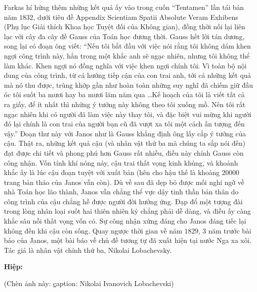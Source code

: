 \begin{multicols}{2}
	
	\vskip 0.1cm
	Farkas hí hửng thêm những kết quả ấy vào trong cuốn ``Tentamen'' lần tái bản năm $1832$, dưới tiêu đề Appendix Scientiam Spatii Absolute Veram Exhibens (Phụ lục Giải thích Khoa học Tuyệt đối của Không gian), đồng thời nối lại liên lạc với cây đa cây đề Gauss của Toán học đương thời. Gauss hết lời tán dương, song lại có đoạn ông viết:
	\vskip 0.1cm
	``Nếu tôi bắt đầu với việc nói rằng tôi không dám khen ngợi công trình này, hẳn trong một khắc anh sẽ ngạc nhiên, nhưng tôi không thể làm khác. Khen ngợi nó đồng nghĩa với việc khen ngợi chính tôi. Vì toàn bộ nội dung của công trình, từ cả hướng tiếp cận của con trai anh, tới cả những kết quả mà nó thu được, trùng khớp gần như hoàn toàn những suy nghĩ đã chiếm giữ đầu óc tôi suốt ba mươi hay ba mươi lăm năm qua \ldots Kế hoạch của tôi là viết tất cả ra giấy, để ít nhất thì những ý tưởng này không theo tôi xuống mồ. Nên tôi rất ngạc nhiên khi có người đã làm việc này thay tôi, và đặc biệt vui mừng khi người đó lại chính là con trai của người bạn cũ đã vượt xa tôi một cách ấn tượng đến vậy.''
	\vskip 0.1cm
	Đoạn thư này với Janos như là Gauss khẳng định ông lấy cắp ý tưởng của cậu. Thật ra, những kết quả cậu (và nhân vật thứ ba mà chúng ta sắp nói đến) đạt được chi tiết và phong phú hơn Gauss rất nhiều, điều này chính Gauss còn công nhận. Vốn tính khí nóng nảy, cậu trai thất vọng kinh khủng, và khoảnh khắc ấy là lúc cậu đoạn tuyệt với xuất bản (hên cho hậu thế là khoảng $20000$ trang bản thảo của Janos vẫn còn). Dù về sau đã dẹp bỏ được mối nghi ngờ về nhà Toán học lão thành, Janos vẫn chẳng thể vực dậy tinh thần bản thân do công trình của cậu chẳng hề được người đời hưởng ứng. Đạp đổ một tượng đài trong lòng nhân loại suốt hai thiên nhiên kỷ chẳng phải dễ dàng, và điều ấy càng khắc sâu nỗi thất vọng vốn có. Sự công nhận xứng đáng cho Janos đáng tiếc lại không đến khi cậu còn sống.
	\vskip 0.1cm
	Quay ngược thời gian về năm $1829$, $3$ năm trước bài báo của Janos, một bài báo về chủ đề tương tự đã xuất hiện tại nước Nga xa xôi. Tác giả là nhân vật chính thứ ba, Nikolai Lobachevsky. 
	
	
	
\textbf{Hiệp: }

(Chèn ảnh này: \href{ttps://en.wikipedia.org/wiki/Nikolai_Lobachevsky#/media/File:Lobachevsky_03_crop.jpg}
caption: Nikolai Ivanovich Lobachevski)
	

\end{multicols}
